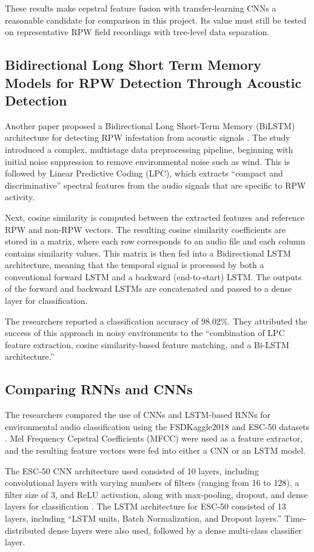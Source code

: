 \documentclass[12pt,a4paper,oneside]{memoir}
\begin{document}
These results make cepstral feature fusion with transfer-learning CNNs a reasonable candidate for comparison in this project. Its value must still be tested on representative RPW field recordings with tree-level data separation.

\subsection{Bidirectional Long Short Term Memory Models for RPW Detection Through Acoustic Detection}

Another paper proposed a Bidirectional Long Short-Term Memory (BiLSTM) architecture for detecting RPW infestation from acoustic signals \cite{saranya2025}. The study introduced a complex, multistage data preprocessing pipeline, beginning with initial noise suppression to remove environmental noise such as wind. This is followed by Linear Predictive Coding (LPC), which extracts ``compact and discriminative'' spectral features from the audio signals that are specific to RPW activity.

Next, cosine similarity is computed between the extracted features and reference RPW and non-RPW vectors. The resulting cosine similarity coefficients are stored in a matrix, where each row corresponds to an audio file and each column contains similarity values. This matrix is then fed into a Bidirectional LSTM architecture, meaning that the temporal signal is processed by both a conventional forward LSTM and a backward (end-to-start) LSTM. The outputs of the forward and backward LSTMs are concatenated and passed to a dense layer for classification.

The researchers reported a classification accuracy of 98.02\%. They attributed the success of this approach in noisy environments to the ``combination of LPC feature extraction, cosine similarity-based feature matching, and a Bi-LSTM architecture.''

\subsection{Comparing RNNs and CNNs}

The researchers compared the use of CNNs and LSTM-based RNNs for environmental audio classification using the FSDKaggle2018 and ESC-50 datasets \cite{rezaul2024,fonseca2018}. Mel Frequency Cepstral Coefficients (MFCC) were used as a feature extractor, and the resulting feature vectors were fed into either a CNN or an LSTM model.

The ESC-50 CNN architecture used consisted of 10 layers, including convolutional layers with varying numbers of filters (ranging from 16 to 128), a filter size of 3, and ReLU activation, along with max-pooling, dropout, and dense layers for classification \cite{rezaul2024}. The LSTM architecture for ESC-50 consisted of 13 layers, including ``LSTM units, Batch Normalization, and Dropout layers.'' Time-distributed dense layers were also used, followed by a dense multi-class classifier layer.
\end{document}
